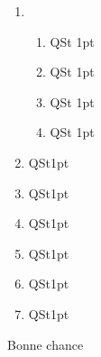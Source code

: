 \documentclass[12pt,a4paper]{report}
\begin{document}
\begin{exo}
	\begin{enumerate}
		\item 
		
		\begin{enumerate}
			\item  QSt        \hfill 1pt
			\item QSt        \hfill 1pt
			\item QSt        \hfill 1pt
			\item QSt         \hfill 1pt
		\end{enumerate}
		\item QSt\hfill 1pt
		\item QSt\hfill 1pt
		\item QSt\hfill 1pt
		\item QSt\hfill 1pt
		\item QSt\hfill 1pt
		\item QSt\hfill 1pt
	\end{enumerate}
\end{exo}
	\begin{center}
	 \Large{Bonne chance } 

\end{center}


\end{document}
